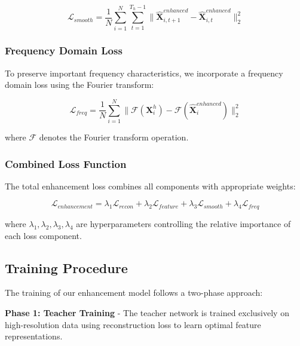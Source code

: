 \begin{equation}
\mathcal{L}_{smooth} = \frac{1}{N} \sum_{i=1}^{N} \sum_{t=1}^{T_h-1} \|\hat{\mathbf{X}}^{enhanced}_{i,t+1} - \hat{\mathbf{X}}^{enhanced}_{i,t}\|_2^2
\end{equation}

\subsubsection{Frequency Domain Loss}

\hspace{2em}To preserve important frequency characteristics, we incorporate a frequency domain loss using the Fourier transform:

\begin{equation}
\mathcal{L}_{freq} = \frac{1}{N} \sum_{i=1}^{N} \|\mathcal{F}(\mathbf{X}^h_i) - \mathcal{F}(\hat{\mathbf{X}}^{enhanced}_i)\|_2^2
\end{equation}

where $\mathcal{F}$ denotes the Fourier transform operation.

\subsubsection{Combined Loss Function}

\hspace{2em}The total enhancement loss combines all components with appropriate weights:

\begin{equation}
\mathcal{L}_{enhancement} = \lambda_1 \mathcal{L}_{recon} + \lambda_2 \mathcal{L}_{feature} + \lambda_3 \mathcal{L}_{smooth} + \lambda_4 \mathcal{L}_{freq}
\end{equation}

where $\lambda_1, \lambda_2, \lambda_3, \lambda_4$ are hyperparameters controlling the relative importance of each loss component.

\subsection{Training Procedure}

\hspace{2em}The training of our enhancement model follows a two-phase approach:

\textbf{Phase 1: Teacher Training} - The teacher network is trained exclusively on high-resolution data using reconstruction loss to learn optimal feature representations.

